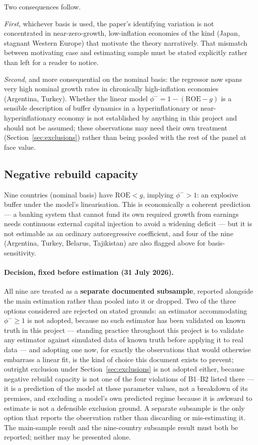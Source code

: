 \documentclass[11pt]{article}
\begin{document}
Two consequences follow.

\emph{First}, whichever basis is used, the paper's identifying variation
is not concentrated in near-zero-growth, low-inflation economies of the
kind (Japan, stagnant Western Europe) that motivate the theory
narratively. That mismatch between motivating case and estimating sample
must be stated explicitly rather than left for a reader to notice.

\emph{Second}, and more consequential on the nominal basis: the regressor
now spans very high nominal growth rates in chronically high-inflation
economies (Argentina, Turkey). Whether the linear model
$\phi^- = 1-(\mathrm{ROE}-g)$ is a sensible description of buffer dynamics
in a hyperinflationary or near-hyperinflationary economy is not
established by anything in this project and should not be assumed; these
observations may need their own treatment (Section~\ref{sec:exclusions})
rather than being pooled with the rest of the panel at face value.

\subsection{Negative rebuild capacity}

Nine countries (nominal basis) have $\mathrm{ROE} < g$, implying
$\phi^- > 1$: an explosive buffer under the model's linearisation. This is
economically a coherent prediction --- a banking system that cannot fund
its own required growth from earnings needs continuous external capital
injection to avoid a widening deficit --- but it is not estimable as an
ordinary autoregressive coefficient, and four of the nine (Argentina,
Turkey, Belarus, Tajikistan) are also flagged above for basis-sensitivity.

\paragraph{Decision, fixed before estimation (31 July 2026).} All nine are
treated as a \textbf{separate documented subsample}, reported alongside
the main estimation rather than pooled into it or dropped. Two of the
three options considered are rejected on stated grounds: an estimator
accommodating $\phi^- \geq 1$ is not adopted, because no such estimator
has been validated on known truth in this project --- standing practice
throughout this project is to validate any estimator against simulated
data of known truth before applying it to real data ---
and adopting one now, for exactly the
observations that would otherwise embarrass a linear fit, is the kind of
choice this document exists to prevent; outright exclusion under
Section~\ref{sec:exclusions} is not adopted either, because negative
rebuild capacity is not one of the four violations of B1--B2 listed
there --- it is a prediction of the model at these parameter values, not
a breakdown of its premises, and excluding a model's own predicted
regime because it is awkward to estimate is not a defensible exclusion
ground. A separate subsample is the only option that reports the
observation rather than discarding or mis-estimating it. The main-sample
result and the nine-country subsample result must both be reported;
neither may be presented alone.
\end{document}
